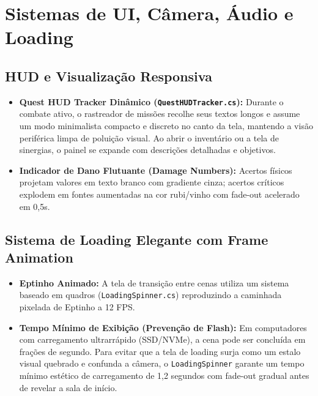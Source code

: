 \documentclass[a4paper,12pt]{report}
\begin{document}
\chapter{Sistemas de UI, Câmera, Áudio e Loading}

\section{HUD e Visualização Responsiva}
\begin{itemize}
    \item \textbf{Quest HUD Tracker Dinâmico (\texttt{QuestHUDTracker.cs}):} Durante o combate ativo, o rastreador de missões recolhe seus textos longos e assume um modo minimalista compacto e discreto no canto da tela, mantendo a visão periférica limpa de poluição visual. Ao abrir o inventário ou a tela de sinergias, o painel se expande com descrições detalhadas e objetivos.
    \item \textbf{Indicador de Dano Flutuante (Damage Numbers):} Acertos físicos projetam valores em texto branco com gradiente cinza; acertos críticos explodem em fontes aumentadas na cor rubi/vinho com fade-out acelerado em 0,5s.
\end{itemize}

\section{Sistema de Loading Elegante com Frame Animation}
\begin{itemize}
    \item \textbf{Eptinho Animado:} A tela de transição entre cenas utiliza um sistema baseado em quadros (\texttt{LoadingSpinner.cs}) reproduzindo a caminhada pixelada de Eptinho a 12 FPS.
    \item \textbf{Tempo Mínimo de Exibição (Prevenção de Flash):} Em computadores com carregamento ultrarrápido (SSD/NVMe), a cena pode ser concluída em frações de segundo. Para evitar que a tela de loading surja como um estalo visual quebrado e confunda a câmera, o \texttt{LoadingSpinner} garante um tempo mínimo estético de carregamento de 1,2 segundos com fade-out gradual antes de revelar a sala de início.
\end{itemize}
\end{document}
